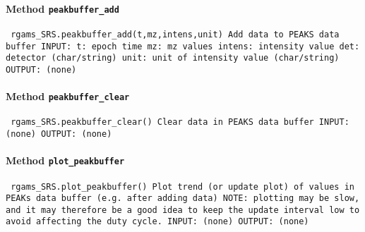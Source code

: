 \paragraph{Method \texttt{peakbuffer_add}}
\vspace{1ex}
\texttt{\newline
rgams_SRS.peakbuffer_add(t,mz,intens,unit)\newline
\newline
Add data to PEAKS data buffer\newline
\newline
INPUT:\newline
t: epoch time\newline
mz: mz values\newline
intens: intensity value\newline
det: detector (char/string)\newline
unit: unit of intensity value (char/string)\newline
\newline
OUTPUT:\newline
(none)\newline
\newline
}

\paragraph{Method \texttt{peakbuffer_clear}}
\vspace{1ex}
\texttt{\newline
rgams_SRS.peakbuffer_clear()\newline
\newline
Clear data in PEAKS data buffer\newline
\newline
INPUT:\newline
(none)\newline
\newline
OUTPUT:\newline
(none)\newline
\newline
}

\paragraph{Method \texttt{plot_peakbuffer}}
\vspace{1ex}
\texttt{\newline
rgams_SRS.plot_peakbuffer()\newline
\newline
Plot trend (or update plot) of values in PEAKs data buffer (e.g. after adding data)\newline
NOTE: plotting may be slow, and it may therefore be a good idea to keep the update interval low to avoid affecting the duty cycle.\newline
\newline
INPUT:\newline
(none)\newline
\newline
OUTPUT:\newline
(none)\newline
\newline
}

